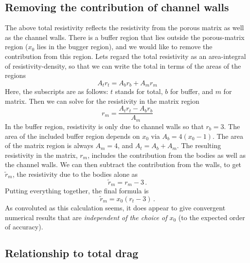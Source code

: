 \documentclass[11pt]{article}
\begin{document}
\subsection{Removing the contribution of channel walls}
The above total resistivity reflects the resistivity from the porous matrix as well as the channel walls. There is a buffer region that lies outside the porous-matrix region ($x_0$ lies in the bugger region), and we would like to remove the contribution from this region. Lets regard the total resistivity as an area-integral of resistivity-density, so that we can write the total in terms of the areas of the regions
\begin{equation}
A_{t} r_{t} = A_{b} r_{b} + A_{m} r_{m}
\end{equation}
Here, the subscripts are as follows: $t$ stands for total, $b$ for buffer, and $m$ for matrix. Then we can solve for the resistivity in the matrix region
\begin{equation}
r_m = \frac{A_t r_t - A_b r_b}{A_m}
\end{equation}
In the buffer region, resistivity is only due to channel walls so that $r_b = 3$. The area of the included buffer region depends on $x_0$ via $A_b = 4(x_0 - 1)$. The area of the matrix region is always $A_m = 4$, and $A_t = A_b + A_m$. The resulting resistivity in the matrix, $r_m$, includes the contribution from the bodies as well as the channel walls. We can then subtract the contribution from the walls, to get $\tilde{r}_m$, the resistivity due to the bodies alone as
\begin{equation}
\tilde{r}_m = r_m - 3 \, .
\end{equation}
Putting everything together, the final formula is
\begin{equation}
\tilde{r}_m = x_0 (r_t - 3) \, .
\end{equation}
As convoluted as this calculation seems, it does appear to give convergent numerical results that are {\em independent of the choice of $x_0$} (to the expected order of accuracy).

\subsection{Relationship to total drag}
\end{document}
